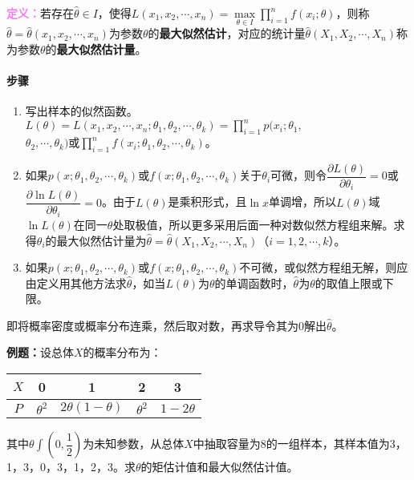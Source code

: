 \documentclass[UTF8, 12pt]{ctexart}
\begin{document}
\textcolor{violet}{\textbf{定义：}}若存在$\hat{\theta}\in I$，使得$L(x_1,x_2,\cdots,x_n)=\max\limits_{\theta\in I}\prod\limits_{i=1}^nf(x_i;\theta)$，则称$\hat{\theta}=\hat{\theta}(x_1,x_2,\cdots,x_n)$为参数$\theta$的\textbf{最大似然估计}，对应的统计量$\hat{\theta}(X_1,X_2,\cdots,X_n)$称为参数$\theta$的\textbf{最大似然估计量}。

\paragraph{步骤} \leavevmode \medskip

\begin{enumerate}
    \item 写出样本的似然函数。$L(\theta)=L(x_1,x_2,\cdots,x_n;\theta_1,\theta_2,\cdots,\theta_k)=\prod\limits_{i=1}^np(x_i;\theta_1,$\\$\theta_2,\cdots,\theta_k)$或$\prod\limits_{i=1}^nf(x_i;\theta_1,\theta_2,\cdots,\theta_k)$。
    \item 如果$p(x;\theta_1,\theta_2,\cdots,\theta_k)$或$f(x;\theta_1,\theta_2,\cdots,\theta_k)$关于$\theta_i$可微，则令$\dfrac{\partial L(\theta)}{\partial\theta_i}=0$或$\dfrac{\partial\ln L(\theta)}{\partial\theta_i}=0$。由于$L(\theta)$是乘积形式，且$\ln x$单调增，所以$L(\theta)$域$\ln L(\theta)$在同一$\theta$处取极值，所以更多采用后面一种对数似然方程组来解。求得$\theta_i$的最大似然估计量为$\hat{\theta}=\hat{\theta}(X_1,X_2,\cdots,X_n)$（$i=1,2,\cdots,k$）。
    \item 如果$p(x;\theta_1,\theta_2,\cdots,\theta_k)$或$f(x;\theta_1,\theta_2,\cdots,\theta_k)$不可微，或似然方程组无解，则应由定义用其他方法求$\hat{\theta}$，如当$L(\theta)$为$\theta$的单调函数时，$\hat{\theta}$为$\theta$的取值上限或下限。
\end{enumerate}

即将概率密度或概率分布连乘，然后取对数，再求导令其为0解出$\hat{\theta}$。

\textbf{例题：}设总体$X$的概率分布为：\medskip

\begin{tabular}{c|cccc}
    \hline
    $X$ & 0 & 1 & 2 & 3 \\ \hline
    $P$ & $\theta^2$ & $2\theta(1-\theta)$ & $\theta^2$ & $1-2\theta$ \\ \hline
\end{tabular} \medskip

其中$\theta\int\left(0,\dfrac{1}{2}\right)$为未知参数，从总体$X$中抽取容量为8的一组样本，其样本值为3，1，3，0，3，1，2，3。求$\theta$的矩估计值和最大似然估计值。
\end{document}
